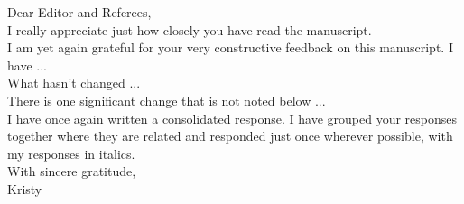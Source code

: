 \documentclass[12pt]{article}
\begin{document}
Dear Editor and Referees, \\

I really appreciate just how closely you have read the manuscript. \\

I am yet again grateful for your very constructive feedback on this manuscript. I have ... \\

What hasn't changed ...  \\

There is one significant change that is not noted below ... \\

I have once again written a consolidated response. I have grouped your responses together where they are related and responded just once wherever possible, with my responses in italics. \\

With sincere gratitude,\\
Kristy

\begin{comment}
\vskip.5in
\section{Clarify ``non-unitary'' interpretation of the model}
\textbf{Editor Point 1}: \\
The "non-unitary" interpretation of your model is not entirely clear to me. When you say that lobbying can change the identity of the median legislator, what mechanism do you have in mind? Does lobbying influence the composition of the legislature, by affecting who gets elected? Or does lobbying somehow change the identity of the median legislator without affecting the composition of the legislature, i.e. without affecting elections? Your current wording suggests the latter, but I am not quite sure. And if it is the latter that you have in mind, how can lobbying change the identity of the median legislator without affecting the distribution of legislators? Perhaps by affecting the decision making process, e.g. who gets to sit on the relevant committees? And if so, is it appropriate to refer to the decisive legislator as the "median" legislator? All of this needs to be clarified.
\begin{itemize}
\renewcommand\labelitemi{-}
	\item \textit{I have clarified the interpretation after Expression (2) in Section 2.2. I do imagine the latter interpretation, but I think in some situations the former makes sense. I have a project currently underway in which I take the electoral approach in explaining the gradual reduction in trade barriers over the post-WWII period. Here, I think it is more of a stretch because we would have to imagine a new election for each enforcement phase of the game.}
\end{itemize}
\end{comment}
\end{document}
